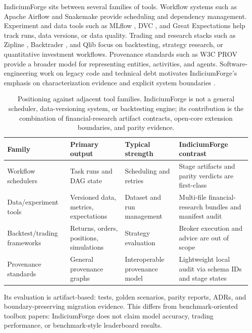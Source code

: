 \documentclass[11pt]{article}
\begin{document}
IndiciumForge sits between several families of tools. Workflow systems such as Apache Airflow
\cite{airflowdocs} and Snakemake \cite{koster2012snakemake} provide scheduling and dependency
management. Experiment and data tools such as MLflow \cite{mlflow2018}, DVC
\cite{dvcdocs}, and Great Expectations \cite{greatexpectationsdocs} help track runs, data
versions, or data quality. Trading and research stacks such as Zipline \cite{ziplinedocs},
Backtrader \cite{backtraderdocs}, and Qlib \cite{qlib2020} focus on backtesting, strategy
research, or quantitative investment workflows. Provenance standards such as W3C PROV
\cite{provdm} provide a broader model for representing entities, activities, and agents.
Software-engineering work on legacy code and technical debt motivates IndiciumForge's
emphasis on characterization evidence and explicit system boundaries \cite{feathers2004legacy,sculley2015hidden}.

\begin{table}[t]
\centering
\small
\begin{tabularx}{\linewidth}{lYYY}
\toprule
Family & Primary output & Typical strength & IndiciumForge contrast \\
\midrule
Workflow schedulers & Task runs and DAG state & Scheduling and retries & Stage artifacts and parity verdicts are first-class \\
Data/experiment tools & Versioned data, metrics, expectations & Dataset and run management & Multi-file financial-research bundles and manifest audit \\
Backtest/trading frameworks & Returns, orders, positions, simulations & Strategy evaluation & Broker execution and advice are out of scope \\
Provenance standards & General provenance graphs & Interoperable provenance model & Lightweight local audit via schema IDs and stage states \\
\bottomrule
\end{tabularx}
\caption{Positioning against adjacent tool families. IndiciumForge is not a general
scheduler, data-versioning system, or backtesting engine; its contribution is the combination
of financial-research artifact contracts, open-core extension boundaries, and parity evidence.}
\label{tab:related}
\end{table}

Its evaluation is artifact-based: tests, golden scenarios, parity reports, ADRs, and
boundary-preserving migration evidence. This differs from benchmark-oriented toolbox papers:
IndiciumForge does not claim model accuracy, trading performance, or benchmark-style
leaderboard results.
\end{document}
